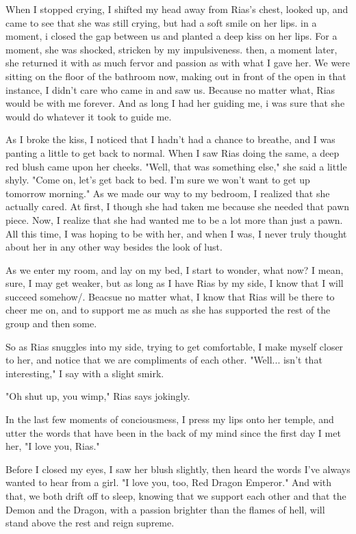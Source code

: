 \documentclass{article}
\begin{document}
When I stopped crying, I shifted my head away from Rias's chest, looked up, and came to see that she was still crying, but had a soft smile on her lips. in a moment, i closed the gap between us and planted a deep kiss on her lips. For a moment, she was shocked, stricken by my impulsiveness. then, a moment later, she returned it with as much fervor and passion as with what I gave her. We were sitting on the floor of the bathroom now, making out in front of the open in that instance, I didn't care who came in and saw us. Because no matter what, Rias would be with me forever. And as long I had her guiding me, i was sure that she would do whatever it took to guide me.

As I broke the kiss, I noticed that I hadn't had a chance to breathe, and I was panting a little to get back to normal. When I saw Rias doing the same, a deep red blush came upon her cheeks. "Well, that was something else," she said a little shyly. "Come on, let's get back to bed. I'm sure we won't want to get up tomorrow morning." As we made our way to my bedroom, I realized that she actually cared. At first, I though she had taken me because she needed that pawn piece. Now, I realize that she had wanted me to be a lot more than just a pawn. All this time, I was hoping to be with her, and when I was, I never truly thought about her in any other way besides the look of lust.

As we enter my room, and lay on my bed, I start to wonder, what now? I mean, sure, I may get weaker, but as long as I have Rias by my side, I know that I will succeed somehow/. Beacsue no matter what, I know that Rias will be there to cheer me on, and to support me as much as she has supported the rest of the group and then some.

So as Rias snuggles into my side, trying to get comfortable, I make myself closer to her, and notice that we are compliments of each other. "Well... isn't that interesting," I say with a slight smirk.

"Oh shut up, you wimp," Rias says jokingly.

In the last few moments of conciousmess, I press my lips onto her temple, and utter the words that have been in the back of my mind since the first day I met her, "I love you, Rias."

Before I closed my eyes, I saw her blush slightly, then heard the words I've always wanted to hear from a girl. "I love you, too, Red Dragon Emperor." And with that, we both drift off to sleep, knowing that we support each other and that the Demon and the Dragon, with a passion brighter than the flames of hell, will stand above the rest and reign supreme.
\end{document}
